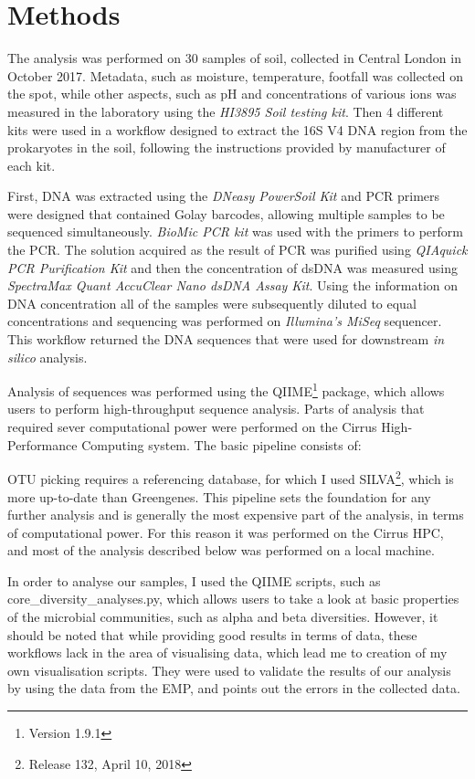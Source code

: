 \documentclass[12pt,twocolumn]{article}
\begin{document}
\section{Methods}
The analysis was performed on 30 samples of soil, collected in Central London in October 2017. Metadata, such as moisture, temperature, footfall was collected on the spot, while other aspects, such as pH and concentrations of various ions was measured in the laboratory using the \textit{HI3895 Soil testing kit}. Then 4 different kits were used in a workflow designed to extract the 16S V4 DNA region from the prokaryotes in the soil, following the instructions provided by manufacturer of each kit.
\par
First, DNA was extracted using the \textit{DNeasy PowerSoil Kit} and PCR primers were designed that contained Golay barcodes, allowing multiple samples to be sequenced simultaneously. \textit{BioMic PCR kit} was used with the primers to perform the PCR. The solution acquired as the result of PCR was purified using \textit{QIAquick PCR Purification Kit} and then the concentration of dsDNA was measured using \textit{SpectraMax Quant AccuClear Nano dsDNA Assay Kit}. Using the information on DNA concentration all of the samples were subsequently diluted to equal concentrations and sequencing was performed on \textit{Illumina's MiSeq} sequencer. This workflow returned the DNA sequences that were used for downstream \textit{in silico} analysis.
\par
Analysis of sequences was performed using the QIIME\footnote{Version 1.9.1} package\cite{Caporaso2010,Kuczynski2012}, which allows users to perform high-throughput sequence analysis. Parts of analysis that required sever computational power were performed on the Cirrus High-Performance Computing system. The basic pipeline consists of:
\par 
OTU picking requires a referencing database, for which I used SILVA\cite{Quast2012}\footnote{Release 132, April 10, 2018}, which is more up-to-date than Greengenes\cite{McDonald2012}. This pipeline sets the foundation for any further analysis and is generally the most expensive part of the analysis, in terms of computational power. For this reason it was performed on the Cirrus HPC, and most of the analysis described below was performed on a local machine. 
\par
In order to analyse our samples, I used the QIIME scripts, such as core\_diversity\_analyses.py, which allows users to take a look at basic properties of the microbial communities, such as alpha and beta diversities. However, it should be noted that while providing good results in terms of data, these workflows lack in the area of visualising data, which lead me to creation of my own visualisation scripts\cite{Anonymous2018}. They were used to validate the results of our analysis by using the data from the EMP, and points out the errors in the collected data.
\end{document}

